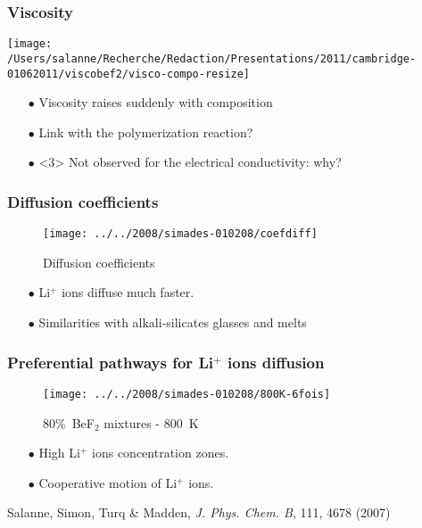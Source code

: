 \documentclass{beamer}
\begin{document}
\begin{frame}
   \frametitle{Viscosity}
   \texttt{[image: /Users/salanne/Recherche/Redaction/Presentations/2011/cambridge-01062011/viscobef2/visco-compo-resize]}
   \begin{itemize}
 \item[$\bullet$] Viscosity raises suddenly with composition
 \item[$\bullet$] Link with the polymerization reaction?
 \item[$\bullet$]<3> Not observed for the electrical conductivity: why?
   \end{itemize}
\end{frame}
\begin{frame}
   \frametitle{Diffusion coefficients}
    \begin{figure}
       \texttt{[image: ../../2008/simades-010208/coefdiff]}
       \vspace{-0.5cm}
       \begin{center}
          {\small Diffusion coefficients}
       \end{center}
    \end{figure}
    \vspace{-0.5cm}
    \begin{itemize}
       \item[$\bullet$] Li$^+$ ions diffuse much faster.
       \item[$\bullet$] Similarities with alkali-silicates glasses and melts
    \end{itemize}
\end{frame}
\begin{frame}
   \frametitle{Preferential pathways for Li$^+$ ions diffusion}
    \begin{figure}
       \texttt{[image: ../../2008/simades-010208/800K-6fois]}
       \vspace{-0.5cm}
       \begin{center}
          {\small 80\%~BeF$_2$ mixtures - 800~K}
       \end{center}
    \end{figure}
    \vspace{-0.5cm}
    \begin{itemize}
       \item[$\bullet$] High Li$^+$ ions concentration zones.
       \item[$\bullet$] Cooperative motion of Li$^+$ ions.
    \end{itemize}
    \begin{center}
   \scriptsize{Salanne, Simon, Turq \& Madden, {\it J. Phys. Chem. B}, 111, 4678 (2007)}
    \end{center}
\end{frame}
\end{document}
